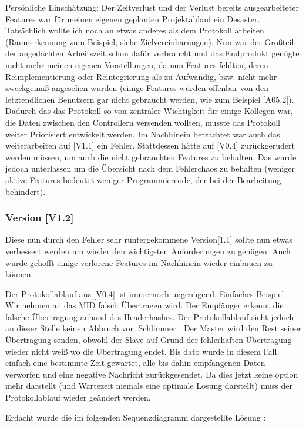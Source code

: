 \begin{itemize}
\begin{center}
\begin{center}
Persönliche Einschätzung:
Der Zeitverlust und der Verlust bereits ausgearbeiteter Features war für meinen eigenen geplanten Projektablauf ein Desaster. Tatsächlich wollte ich noch an etwas anderes als dem Protokoll arbeiten (Raumerkennung zum Beispiel, siehe Zielvereinbarungen). Nun war der Großteil der angedachten Arbeitszeit schon dafür verbraucht und das Endprodukt genügte nicht mehr meinen eigenen Vorstellungen, da nun Features fehlten, deren Reimplementierung oder Reintegrierung als zu Aufwändig, bzw. nicht mehr zweckgemäß angesehen wurden (einige Features würden offenbar von den letztendlichen Benutzern gar nicht gebraucht werden, wie zum Beispiel [A05.2]). Dadurch das das Protokoll so von zentraler Wichtigkeit für einige Kollegen war, die Daten zwischen den Controllern versenden wollten, musste das Protokoll weiter Priorisiert entwickelt werden. Im Nachhinein betrachtet war auch das weiterarbeiten auf [V1.1] ein Fehler. Stattdessen hätte auf [V0.4] zurückgerudert werden müssen, um auch die nicht gebrauchten Features zu behalten. Das wurde jedoch unterlassen um die Übersicht nach dem Fehlerchaos zu behalten (weniger aktive Features bedeutet weniger Programmiercode, der bei der Bearbeitung behindert).



\subsubsection{Version [V1.2]}

Diese nun durch den Fehler sehr runtergekommene Version[1.1] sollte nun etwas verbessert werden um wieder den wichtigsten Anforderungen zu genügen. Auch wurde gehofft einige verlorene Features im Nachhinein wieder einbauen zu können.

Der Protokollablauf aus [V0.4] ist immernoch ungenügend. Einfaches Beispiel:
Wir nehmen an das MID falsch Übertragen wird. Der Empfänger erkennt die falsche Übertragung anhand des Headerhashes. Der Protokollablauf sieht jedoch an dieser Stelle keinen Abbruch vor. Schlimmer : Der Master wird den Rest seiner Übertragung senden, obwohl der Slave auf Grund der fehlerhaften Übertragung wieder nicht weiß wo die Übertragung endet. Bis dato wurde in diesem Fall einfach eine bestimmte Zeit gewartet, alle bis dahin empfangenen Daten verworfen und eine negative Nachricht zurückgesendet. Da dies jetzt keine option mehr darstellt (und Wartezeit niemals eine optimale Lösung darstellt) muss der Protokollablauf wieder geändert werden.

Erdacht wurde die im folgenden Sequenzdiagramm dargestellte Lösung :


\end{center}
\end{center}
\end{itemize}
